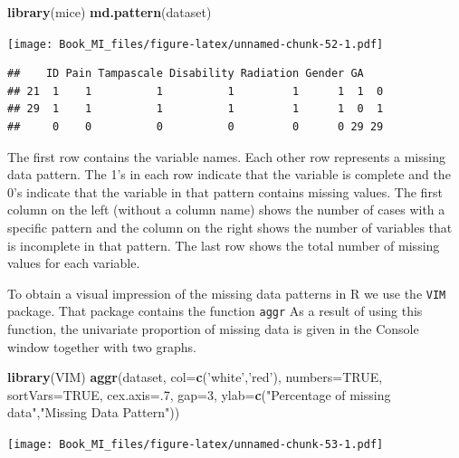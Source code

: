 \documentclass[]{book}
\newenvironment{Shaded}{\begin{snugshade}}{\end{snugshade}}
\newcommand{\KeywordTok}[1]{\textcolor[rgb]{0.13,0.29,0.53}{\textbf{#1}}}
\newcommand{\DataTypeTok}[1]{\textcolor[rgb]{0.13,0.29,0.53}{#1}}
\newcommand{\DecValTok}[1]{\textcolor[rgb]{0.00,0.00,0.81}{#1}}
\newcommand{\StringTok}[1]{\textcolor[rgb]{0.31,0.60,0.02}{#1}}
\newcommand{\OtherTok}[1]{\textcolor[rgb]{0.56,0.35,0.01}{#1}}
\newcommand{\NormalTok}[1]{#1}
\theoremstyle{definition}
\theoremstyle{definition}
\theoremstyle{definition}
\theoremstyle{remark}
\begin{document}
\begin{Shaded}
\begin{Highlighting}[]
\KeywordTok{library}\NormalTok{(mice)}
\KeywordTok{md.pattern}\NormalTok{(dataset)}
\end{Highlighting}
\end{Shaded}

\texttt{[image: Book\_MI\_files/figure-latex/unnamed-chunk-52-1.pdf]}

\begin{verbatim}
##    ID Pain Tampascale Disability Radiation Gender GA   
## 21  1    1          1          1         1      1  1  0
## 29  1    1          1          1         1      1  0  1
##     0    0          0          0         0      0 29 29
\end{verbatim}

The first row contains the variable names. Each other row represents a
missing data pattern. The 1's in each row indicate that the variable is
complete and the 0's indicate that the variable in that pattern contains
missing values. The first column on the left (without a column name)
shows the number of cases with a specific pattern and the column on the
right shows the number of variables that is incomplete in that pattern.
The last row shows the total number of missing values for each variable.

To obtain a visual impression of the missing data patterns in R we use
the \texttt{VIM} package. That package contains the function
\texttt{aggr} As a result of using this function, the univariate
proportion of missing data is given in the Console window together with
two graphs.

\begin{Shaded}
\begin{Highlighting}[]
\KeywordTok{library}\NormalTok{(VIM)}
\KeywordTok{aggr}\NormalTok{(dataset, }\DataTypeTok{col=}\KeywordTok{c}\NormalTok{(}\StringTok{'white'}\NormalTok{,}\StringTok{'red'}\NormalTok{), }\DataTypeTok{numbers=}\OtherTok{TRUE}\NormalTok{, }\DataTypeTok{sortVars=}\OtherTok{TRUE}\NormalTok{, }\DataTypeTok{cex.axis=}\NormalTok{.}\DecValTok{7}\NormalTok{, }\DataTypeTok{gap=}\DecValTok{3}\NormalTok{, }\DataTypeTok{ylab=}\KeywordTok{c}\NormalTok{(}\StringTok{"Percentage of missing data"}\NormalTok{,}\StringTok{"Missing Data Pattern"}\NormalTok{))}
\end{Highlighting}
\end{Shaded}

\texttt{[image: Book\_MI\_files/figure-latex/unnamed-chunk-53-1.pdf]}
\end{document}
